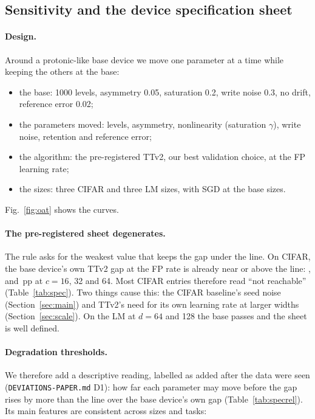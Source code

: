 \subsection{Sensitivity and the device specification sheet}\label{sec:spec}
\paragraph{Design.} Around a protonic-like base device we move one parameter at a time while keeping the others at the base:
\begin{itemize}
\item the base: 1000 levels, asymmetry 0.05, saturation 0.2, write noise 0.3, no drift, reference error 0.02;
\item the parameters moved: levels, asymmetry, nonlinearity (saturation $\gamma$), write noise, retention and reference error;
\item the algorithm: the pre-registered TTv2, our best validation choice, at the FP learning rate;
\item the sizes: three CIFAR and three LM sizes, with SGD at the base sizes.
\end{itemize}
Fig.~\ref{fig:oat} shows the curves.

\paragraph{The pre-registered sheet degenerates.} The rule asks for the weakest value that keeps the gap under the line. On
CIFAR, the base device's own TTv2 gap at the FP rate is already near or above the line:
\RSpecrelTtvTwoCifarWOneSixBasegap, \RSpecrelTtvTwoCifarWThreeTwoBasegap{} and \RSpecrelTtvTwoCifarWSixFourBasegap\,pp at
$c=16$, 32 and 64. Most CIFAR entries therefore read ``not reachable'' (Table~\ref{tab:spec}). Two things cause this: the CIFAR
baseline's seed noise (Section~\ref{sec:main}) and TTv2's need for its own learning rate at larger widths
(Section~\ref{sec:scale}). On the LM at $d=64$ and 128 the base passes and the sheet is well defined.

\paragraph{Degradation thresholds.} We therefore add a descriptive reading, labelled as added after the data were seen
(\texttt{DEVIATIONS-PAPER.md} D1): how far each parameter may move before the gap rises by more than the line over the base
device's own gap (Table~\ref{tab:specrel}). Its main features are consistent across sizes and tasks:


